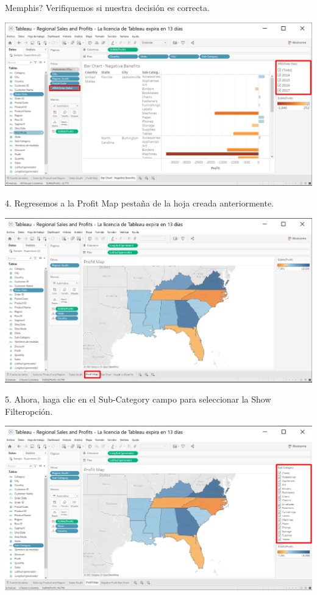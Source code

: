 \documentclass[12pt,letterpaper]{article}
\begin{document}
Memphis? Verifiquemos si nuestra decisión es correcta.
\begin{center}
    \includegraphics[width=16cm]{img/40.png}  
\end{center}
4. Regresemos a la Profit Map pestaña de la hoja creada anteriormente.
\begin{center}
    \includegraphics[width=16cm]{img/41.png}  
\end{center}
5. Ahora, haga clic en el Sub-Category campo para seleccionar la Show Filteropción.
\begin{center}
    \includegraphics[width=16cm]{img/42.png}  
\end{center}
\end{document}

